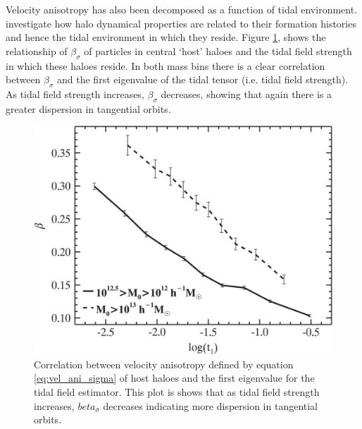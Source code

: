 Velocity anisotropy has also been decomposed as a function of tidal environment. \cite{shi2015} investigate how halo dynamical properties are related to their formation histories and hence the tidal environment in which they reside. Figure \ref{fig:shifig11}, shows the relationship of $\beta_{\sigma}$ of particles in central `host' haloes and the tidal field strength in which these haloes reside. In both mass bins there is a clear correlation between $\beta_{\sigma}$ and the first eigenvalue of the tidal tensor (i.e. tidal field strength). As tidal field strength increases, $\beta_{\sigma}$ decreases, showing that again there is a greater dispersion in tangential orbits. 
\begin{figure}
\begin{center}
	\includegraphics[width=0.5\linewidth]{thesis/latex/dyn_mod_files/shi2015fig11.jpg}
    \caption{Correlation between velocity anisotropy defined by equation \ref{eq:vel_ani_sigma} of host haloes and the first eigenvalue for the tidal field estimator. This plot is shows that as tidal field strength increases, $beta_{\sigma}$ decreases indicating more dispersion in tangential orbits.}
    \label{fig:shifig11}
\end{center}
\end{figure}

